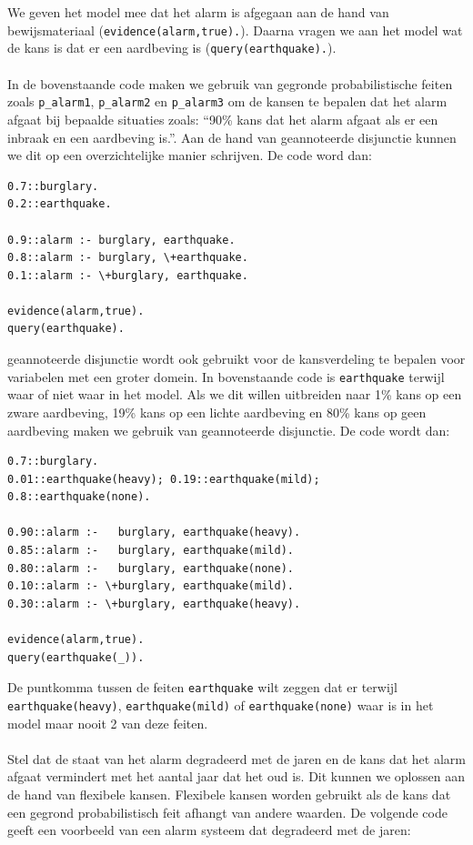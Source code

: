\documentclass[12pt,a4paper,oneside]{book}
\theoremstyle{definition}
\newcommand{\quotes}[1]{``#1''}
\begin{document}
\\\\
We geven het model mee dat het alarm is afgegaan aan de hand van bewijsmateriaal (\lstinline{evidence(alarm,true).}). Daarna vragen we aan het model wat de kans is dat er een aardbeving is (\lstinline{query(earthquake).}).
\\\\
In de bovenstaande code maken we gebruik van gegronde probabilistische feiten zoals \lstinline{p_alarm1}, \lstinline{p_alarm2} en \lstinline{p_alarm3} om de kansen te bepalen dat het alarm afgaat bij bepaalde situaties zoals: \quotes{90\% kans dat het alarm afgaat als er een inbraak en een aardbeving is.}. Aan de hand van geannoteerde disjunctie kunnen we dit op een overzichtelijke manier schrijven. De code word dan:
\begin{lstlisting}
0.7::burglary.
0.2::earthquake.

0.9::alarm :- burglary, earthquake.
0.8::alarm :- burglary, \+earthquake.
0.1::alarm :- \+burglary, earthquake.

evidence(alarm,true).
query(earthquake).
\end{lstlisting}
geannoteerde disjunctie wordt ook gebruikt voor de kansverdeling te bepalen voor variabelen met een groter domein. In bovenstaande code is \lstinline{earthquake} terwijl waar of niet waar in het model. Als we dit willen uitbreiden naar 1\% kans op een zware aardbeving, 19\% kans op een lichte aardbeving en 80\% kans op geen aardbeving maken we gebruik van geannoteerde disjunctie. De code wordt dan:
\begin{lstlisting}
0.7::burglary.
0.01::earthquake(heavy); 0.19::earthquake(mild); 0.8::earthquake(none).

0.90::alarm :-   burglary, earthquake(heavy).
0.85::alarm :-   burglary, earthquake(mild).
0.80::alarm :-   burglary, earthquake(none).
0.10::alarm :- \+burglary, earthquake(mild).
0.30::alarm :- \+burglary, earthquake(heavy).

evidence(alarm,true).
query(earthquake(_)).
\end{lstlisting}
De puntkomma tussen de feiten \lstinline{earthquake} wilt zeggen dat er terwijl \lstinline{earthquake(heavy)}, \lstinline{earthquake(mild)} of \lstinline{earthquake(none)} waar is in het model maar nooit 2 van deze feiten.
\\\\
Stel dat de staat van het alarm degradeerd met de jaren en de kans dat het alarm afgaat vermindert met het aantal jaar dat het oud is. Dit kunnen we oplossen aan de hand van flexibele kansen. Flexibele kansen worden gebruikt als de kans dat een gegrond probabilistisch feit afhangt van andere waarden. De volgende code geeft een voorbeeld van een alarm systeem dat degradeerd met de jaren:
\end{document}
